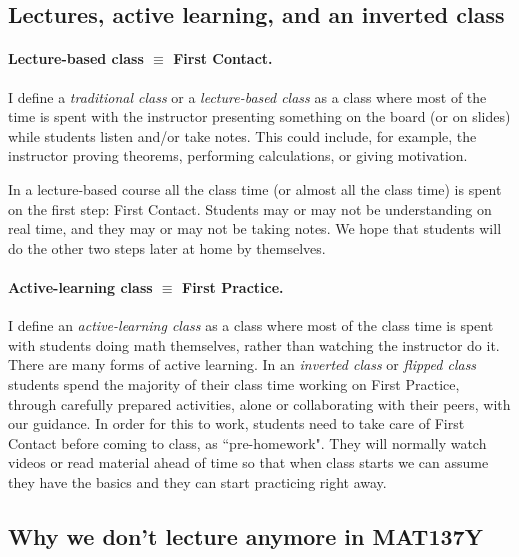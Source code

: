 \documentclass[11pt]{article}
\begin{document}
	\subsection{Lectures, active learning, and an inverted class}

	\paragraph{Lecture-based class $\equiv$ First Contact.}
	I define a \emph{traditional class} or a \emph{lecture-based class} as a class
	where most of the time is spent with the instructor presenting something on
	the board (or on slides) while students listen and/or take notes. This could include,
	for example, the instructor proving theorems, performing calculations, or giving
	motivation.

	{\baselineskip In a lecture-based course all the class time (or almost all the class time) is spent on the first step: First Contact. Students may or may not be understanding on real time, and they may or may not be taking notes. We hope that students will do the other two steps later at home by themselves. }

	\paragraph{Active-learning class $\equiv$ First Practice.}
	I define an \emph{active-learning class} as a class where most of the class
	time is spent with students doing math themselves, rather than watching the instructor
	do it. There are many forms of active learning. In an \emph{\textcolor{137cp1}{inverted
	class}} or \emph{\textcolor{137cp1}{flipped class}} students spend the majority
	of their class time working on First Practice, through carefully prepared
	activities, alone or collaborating with their peers, with our guidance. In order
	for this to work, students need to take care of First Contact before coming to
	class, as ``pre-homework". They will normally watch videos or read material ahead
	of time so that when class starts we can assume they have the basics and they can
	start practicing right away.


	\newpage

	\subsection{Why we don't lecture anymore in MAT137Y}
	\label{sec:nolec}
\end{document}
